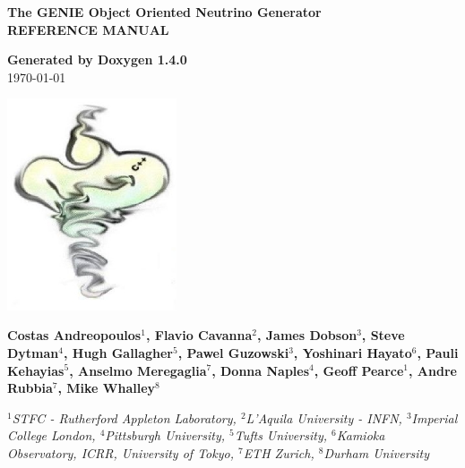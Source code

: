 \documentclass[a4paper]{book}
\begin{document}
\begin{titlepage}
\vspace*{3cm}
\begin{center}

{\Large \textbf{The GENIE Object Oriented Neutrino Generator}}\\
\vspace*{1cm}
{\Large \textbf{REFERENCE MANUAL}}\\
\vspace*{1cm}

{\large \textbf{Generated by Doxygen 1.4.0}}\\
\vspace*{0.5cm}
{\large \today}\\
\vspace*{1cm}

\includegraphics[width=5cm,keepaspectratio]{../../data/logo/genie_logo.eps}

\vspace*{0.6cm}

{\textbf{Costas Andreopoulos$^{1}$, Flavio Cavanna$^{2}$, James Dobson$^{3}$, Steve Dytman$^{4}$,
Hugh Gallagher$^{5}$, Pawel Guzowski$^{3}$, Yoshinari Hayato$^{6}$, Pauli Kehayias$^{5}$, 
Anselmo Meregaglia$^{7}$, Donna Naples$^{4}$, Geoff Pearce$^{1}$, 
Andre Rubbia$^{7}$, Mike Whalley$^{8}$}}\\
\vspace*{0.5cm}

{\textit{
$^{1}$STFC - Rutherford Appleton Laboratory,
$^{2}$L'Aquila University - INFN, 
$^{3}$Imperial College London, 
$^{4}$Pittsburgh University, 
$^{5}$Tufts University,
$^{6}$Kamioka Observatory, ICRR, University of Tokyo, 
$^{7}$ETH Zurich, 
$^{8}$Durham University}}

\end{center}
\end{titlepage}
\clearemptydoublepage
{}
\tableofcontents
\clearemptydoublepage
{}
\end{document}
